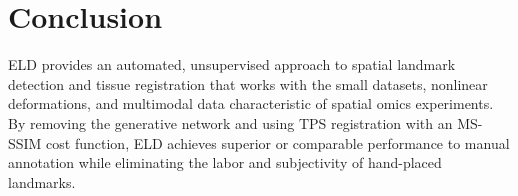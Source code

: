 \documentclass[11pt]{article}
\begin{document}
\section{Conclusion}

ELD provides an automated, unsupervised approach to spatial landmark detection and tissue registration that works with the small datasets, nonlinear deformations, and multimodal data characteristic of spatial omics experiments. By removing the generative network and using TPS registration with an MS-SSIM cost function, ELD achieves superior or comparable performance to manual annotation while eliminating the labor and subjectivity of hand-placed landmarks.



\end{document}
